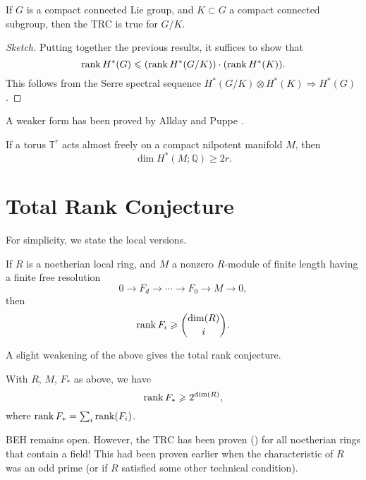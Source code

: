 \documentclass[12pt]{article}
\begin{document}
\begin{thm}
	If $G$ is a compact connected Lie group, and $K \subset G$ a compact connected subgroup, then the TRC is true for $G/K$.
\end{thm}
\begin{proof}[Sketch]
	Putting together the previous results, it suffices to show that
	\begin{equation*} 
		\operatorname{rank} H^{\ast}(G) \leqslant (\operatorname{rank} H^{\ast}(G/K)) \cdot (\operatorname{rank} H^{\ast}(K)).
	\end{equation*}
	This follows from the Serre spectral sequence $H^{\ast}(G/K) \otimes H^{\ast}(K) \Rightarrow H^{\ast}(G)$.
\end{proof}

A weaker form has been proved by Allday and Puppe \cite{AlldayPuppeMinimalHirschBrown}.
\begin{thm}
	If a torus $\mathbb{T}^{r}$ acts almost freely on a compact nilpotent manifold $M$, then
	\begin{equation*} 
		\dim H^{\ast}(M; \mathbb{Q}) \ge 2r.
	\end{equation*}
\end{thm}

\section{Total Rank Conjecture}

For simplicity, we state the local versions.
\begin{conj}
	If $R$ is a noetherian local ring, and $M$ a nonzero $R$-module of finite length having a finite free resolution
	\begin{equation*} 
		0 \to F_{d} \to \cdots \to F_{0} \to M \to 0,
	\end{equation*}
	then
	\begin{equation*} 
		\operatorname{rank} F_{i} \geqslant \binom{\dim(R)}{i}.
	\end{equation*}
\end{conj}

A slight weakening of the above gives the total rank conjecture.

\begin{conj}
	With $R$, $M$, $F_{\ast}$ as above, we have
	\begin{equation*} 
		\operatorname{rank} F_{\ast} \geqslant 2^{\dim(R)},
	\end{equation*}
	where $\operatorname{rank} F_{\ast} = \sum_{i} \operatorname{rank}(F_{i})$.
\end{conj}

BEH remains open. However, the TRC has been proven (\cite{VandebogertTotalRankConjecture}) for all noetherian rings that contain a field! This had been proven earlier when the characteristic of $R$ was an odd prime (or if $R$ satisfied some other technical condition).  

\printbibliography
\end{document}
